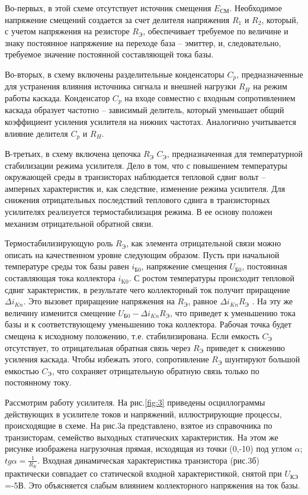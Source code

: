 Во-первых, в этой схеме отсутствует источник смещения $E_{\text{СМ}}$. Необходимое напряжение смещений создается за счет делителя напряжения $R_1$ и $R_2$, который, с учетом напряжения на резисторе $R_{\text{Э}}$, обеспечивает требуемое по величине и знаку постоянное напряжение на переходе база – эмиттер, и, следовательно, требуемое значение постоянной составляющей тока базы.

Во-вторых, в схему включены разделительные конденсаторы $C_p$, предназначенные для устранения влияния источника сигнала и внешней нагрузки $R_H$ на режим работы каскада. Конденсатор $C_p$ на входе совместно с входным сопротивлением каскада образует частотно – зависимый делитель, который уменьшает общий коэффициент усиления усилителя на нижних частотах. Аналогично учитывается влияние делителя $C_p$ и $R_H$. 

В-третьих, в схему включена цепочка $R_{\text{Э}}$ $C_{\text{Э}}$, предназначенная для температурной стабилизации режима  усилителя. Дело в том, что с повышением температуры окружающей среды в транзисторах наблюдается тепловой сдвиг вольт – амперных характеристик и, как следствие, изменение режима усилителя. Для снижения отрицательных последствий теплового сдвига в транзисторных усилителях реализуется термостабилизация режима. В ее основу положен механизм отрицательной обратной связи.

Термостабилизирующую роль $R_{\text{Э}}$, как элемента отрицательной связи можно описать на качественном уровне следующим образом. Пусть при начальной температуре среды ток базы равен $i_{\text{Б0}}$, напряжение смещения $U_{\text{Б0}}$, постоянная составляющая тока коллектора $i_{\text{K0}}$. С ростом температуры происходит тепловой сдвиг характеристик, в результате чего коллекторный ток получит приращение $\Delta i_{Kn}$. Это вызовет приращение напряжения на $R_{\text{Э}}$, равное $\Delta i_{Kn}R_{\text{Э}}$ . На эту же величину изменится смещение $U_{\text{Б0}}-\Delta i_{Kn}R_{\text{Э}}$, что приведет к уменьшению тока базы и к соответствующему уменьшению тока коллектора. Рабочая точка будет смещена к исходному положению, т.е. стабилизирована. Если емкость $C_{\text{Э}}$ отсутствует, то отрицательная обратная связь через $R_{\text{Э}}$ приведет к снижению усиления каскада. Чтобы избежать этого, сопротивление $R_{\text{Э}}$ шунтируют большой емкостью $C_{\text{Э}}$, что сохраняет отрицательную обратную связь только по постоянному току.

Рассмотрим работу усилителя. На рис.\ref{fig:3} приведены осциллограммы действующих в усилителе токов и напряжений, иллюстрирующие процессы, происходящие в схеме. На рис.3а представлено, взятое из справочника по транзисторам, семейство выходных статических характеристик. На этом же рисунке изображена нагрузочная прямая, исходящая из точки (0,-10) под углом $\alpha$; $tg\alpha = \frac{1}{R_K}$. Входная динамическая характеристика транзистора (рис.3б) практически совпадает со статической входной характеристикой, снятой при $U_{\text{КЭ}}$=-5В. Это объясняется слабым влиянием коллекторного напряжения на ток базы.

